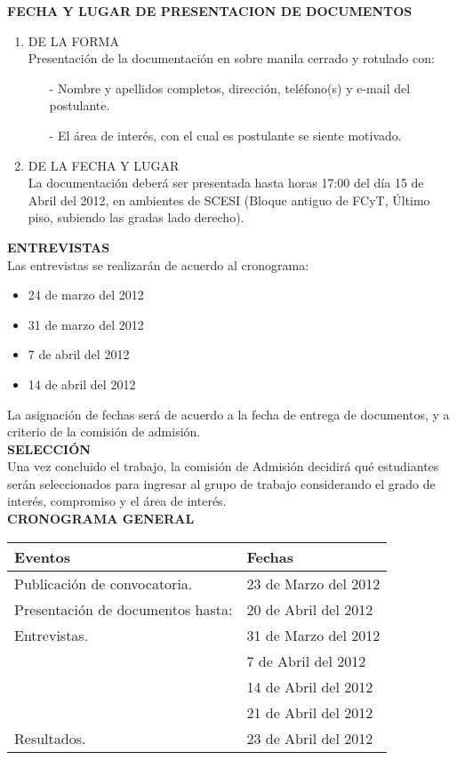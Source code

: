 \documentclass[11pt,letterpaper]{report}
\begin{document}
{\bf \small FECHA Y LUGAR DE PRESENTACION DE DOCUMENTOS}
\begin{enumerate}
\item DE LA FORMA\\
Presentación de la documentación en sobre manila cerrado y rotulado con:
\begin{itemize}
\item[-] Nombre y apellidos completos, dirección, teléfono(s) y e-mail del postulante.
\item[-] El área de interés, con el cual es postulante se siente motivado.
\end{itemize}
\item DE LA FECHA Y LUGAR\\
La documentación deberá ser presentada hasta horas 17:00 del día 15 de Abril del 2012, en ambientes de SCESI (Bloque antiguo de FCyT, Último piso, subiendo las gradas lado derecho).
\end{enumerate}

{\bf \small ENTREVISTAS}\\

Las entrevistas se realizarán de acuerdo al cronograma:
\begin{itemize}
\item 24 de marzo del 2012
\item 31 de marzo del 2012
\item 7 de abril del 2012
\item 14 de abril del 2012
\end{itemize}
La asignación de fechas será de acuerdo a la fecha de entrega de documentos, y a criterio de la comisión de admisión.\\

{\bf \small SELECCIÓN}\\

Una vez concluido el trabajo, la comisión de Admisión decidirá qué estudiantes serán seleccionados para ingresar al grupo de trabajo considerando el grado de interés, compromiso y el área  de interés.\\

{\bf \small CRONOGRAMA GENERAL}

\begin{center}
\begin{tabular}{|l|l|}
\hline
{\bf Eventos} & {\bf Fechas}\\
\hline
Publicación de convocatoria. & 23 de Marzo del 2012\\
\hline
Presentación de documentos hasta: & 20 de Abril del 2012\\
\hline
Entrevistas. & 31 de Marzo del 2012 \\
\hline
& 7 de Abril del 2012\\
\hline
& 14 de Abril del 2012\\
\hline
& 21 de Abril del 2012\\
\hline
Resultados. & 23 de Abril del 2012\\
\hline
\end{tabular}
\end{center}
 \vspace{1.7cm}
\end{document}
